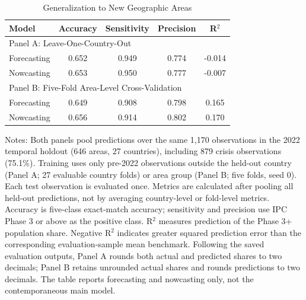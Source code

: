 \documentclass[pdflatex,sn-mathphys-num]{sn-jnl}%
\theoremstyle{thmstyleone}%
\theoremstyle{thmstyletwo}%
\theoremstyle{thmstylethree}%
\begin{document}
\newpage
\clearpage
\begin{table}
\centering
\caption{Generalization to New Geographic Areas}\label{tab:spatial_generalization}
\begin{tabular}{lcccc}
\hline
\textbf{Model} & \textbf{Accuracy} & \textbf{Sensitivity} & \textbf{Precision} & \textbf{R$^2$} \\
\hline
\multicolumn{5}{l}{Panel A: Leave-One-Country-Out} \\
Forecasting & 0.652 & 0.949 & 0.774 & -0.014 \\
Nowcasting & 0.653 & 0.950 & 0.777 & -0.007 \\
\hline
\multicolumn{5}{l}{Panel B: Five-Fold Area-Level Cross-Validation}  \\
Forecasting & 0.649 & 0.908 & 0.798 & 0.165 \\
Nowcasting & 0.656 & 0.914 & 0.802 & 0.170 \\
\hline 
\end{tabular}
Notes: Both panels pool predictions over the same 1,170 observations in the 2022 temporal holdout (646 areas, 27 countries), including 879 crisis observations (75.1\%). Training uses only pre-2022 observations outside the held-out country (Panel A; 27 evaluable country folds) or area group (Panel B; five folds, seed 0). Each test observation is evaluated once. Metrics are calculated after pooling all held-out predictions, not by averaging country-level or fold-level metrics. Accuracy is five-class exact-match accuracy; sensitivity and precision use IPC Phase 3 or above as the positive class. R$^2$ measures prediction of the Phase 3+ population share. Negative R$^2$ indicates greater squared prediction error than the corresponding evaluation-sample mean benchmark. Following the saved evaluation outputs, Panel A rounds both actual and predicted shares to two decimals; Panel B retains unrounded actual shares and rounds predictions to two decimals. The table reports forecasting and nowcasting only, not the contemporaneous main model.
\end{table}
\end{document}
